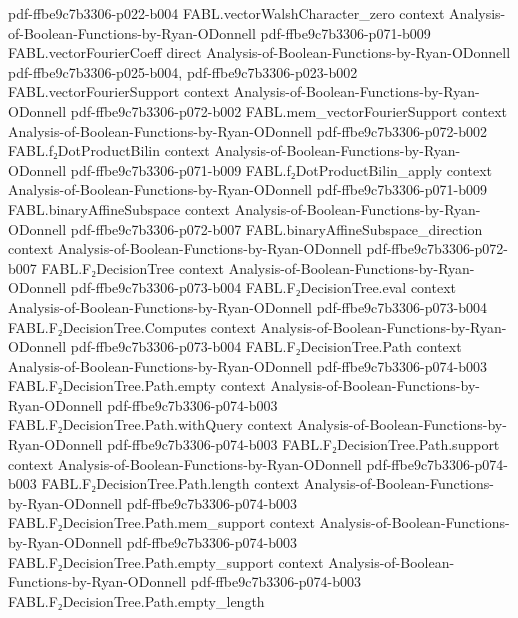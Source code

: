 \begin{theorem}
  {pdf-ffbe9c7b3306-p022-b004}
\proofstep
  {FABL.vectorWalshCharacter_zero}
  {context}
  {Analysis-of-Boolean-Functions-by-Ryan-ODonnell}
  {pdf-ffbe9c7b3306-p071-b009}
\proofstep
  {FABL.vectorFourierCoeff}
  {direct}
  {Analysis-of-Boolean-Functions-by-Ryan-ODonnell}
  {pdf-ffbe9c7b3306-p025-b004,
    pdf-ffbe9c7b3306-p023-b002}
\proofstep
  {FABL.vectorFourierSupport}
  {context}
  {Analysis-of-Boolean-Functions-by-Ryan-ODonnell}
  {pdf-ffbe9c7b3306-p072-b002}
\proofstep
  {FABL.mem_vectorFourierSupport}
  {context}
  {Analysis-of-Boolean-Functions-by-Ryan-ODonnell}
  {pdf-ffbe9c7b3306-p072-b002}
\proofstep
  {FABL.f₂DotProductBilin}
  {context}
  {Analysis-of-Boolean-Functions-by-Ryan-ODonnell}
  {pdf-ffbe9c7b3306-p071-b009}
\proofstep
  {FABL.f₂DotProductBilin_apply}
  {context}
  {Analysis-of-Boolean-Functions-by-Ryan-ODonnell}
  {pdf-ffbe9c7b3306-p071-b009}
\proofstep
  {FABL.binaryAffineSubspace}
  {context}
  {Analysis-of-Boolean-Functions-by-Ryan-ODonnell}
  {pdf-ffbe9c7b3306-p072-b007}
\proofstep
  {FABL.binaryAffineSubspace_direction}
  {context}
  {Analysis-of-Boolean-Functions-by-Ryan-ODonnell}
  {pdf-ffbe9c7b3306-p072-b007}
\proofstep
  {FABL.F₂DecisionTree}
  {context}
  {Analysis-of-Boolean-Functions-by-Ryan-ODonnell}
  {pdf-ffbe9c7b3306-p073-b004}
\proofstep
  {FABL.F₂DecisionTree.eval}
  {context}
  {Analysis-of-Boolean-Functions-by-Ryan-ODonnell}
  {pdf-ffbe9c7b3306-p073-b004}
\proofstep
  {FABL.F₂DecisionTree.Computes}
  {context}
  {Analysis-of-Boolean-Functions-by-Ryan-ODonnell}
  {pdf-ffbe9c7b3306-p073-b004}
\proofstep
  {FABL.F₂DecisionTree.Path}
  {context}
  {Analysis-of-Boolean-Functions-by-Ryan-ODonnell}
  {pdf-ffbe9c7b3306-p074-b003}
\proofstep
  {FABL.F₂DecisionTree.Path.empty}
  {context}
  {Analysis-of-Boolean-Functions-by-Ryan-ODonnell}
  {pdf-ffbe9c7b3306-p074-b003}
\proofstep
  {FABL.F₂DecisionTree.Path.withQuery}
  {context}
  {Analysis-of-Boolean-Functions-by-Ryan-ODonnell}
  {pdf-ffbe9c7b3306-p074-b003}
\proofstep
  {FABL.F₂DecisionTree.Path.support}
  {context}
  {Analysis-of-Boolean-Functions-by-Ryan-ODonnell}
  {pdf-ffbe9c7b3306-p074-b003}
\proofstep
  {FABL.F₂DecisionTree.Path.length}
  {context}
  {Analysis-of-Boolean-Functions-by-Ryan-ODonnell}
  {pdf-ffbe9c7b3306-p074-b003}
\proofstep
  {FABL.F₂DecisionTree.Path.mem_support}
  {context}
  {Analysis-of-Boolean-Functions-by-Ryan-ODonnell}
  {pdf-ffbe9c7b3306-p074-b003}
\proofstep
  {FABL.F₂DecisionTree.Path.empty_support}
  {context}
  {Analysis-of-Boolean-Functions-by-Ryan-ODonnell}
  {pdf-ffbe9c7b3306-p074-b003}
\proofstep
  {FABL.F₂DecisionTree.Path.empty_length}

\end{theorem}
